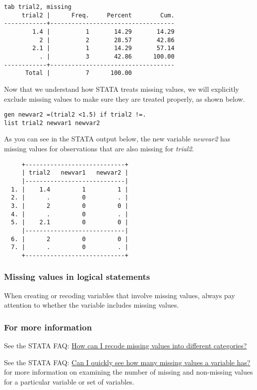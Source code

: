 \begin{lstlisting}
tab trial2, missing
     trial2 |      Freq.     Percent        Cum.
------------+-----------------------------------
        1.4 |          1       14.29       14.29
          2 |          2       28.57       42.86
        2.1 |          1       14.29       57.14
          . |          3       42.86      100.00
------------+-----------------------------------
      Total |          7      100.00
\end{lstlisting}

Now that we understand how STATA treats missing values, we will explicitly exclude missing values to make sure they are treated properly, as shown below.

\begin{lstlisting}
gen newvar2 =(trial2 <1.5) if trial2 !=.
list trial2 newvar1 newvar2
\end{lstlisting}

As you can see in the STATA output below, the new variable \textit{newvar2} has missing values for observations that are also missing for \textit{trial2}.

\begin{lstlisting}
     +----------------------------+
     | trial2   newvar1   newvar2 |
     |----------------------------|
  1. |    1.4         1         1 |
  2. |      .         0         . |
  3. |      2         0         0 |
  4. |      .         0         . |
  5. |    2.1         0         0 |
     |----------------------------|
  6. |      2         0         0 |
  7. |      .         0         . |
     +----------------------------+
\end{lstlisting}

\subsubsection{Missing values in logical statements}

When creating or recoding variables that involve missing values, always pay attention to whether the variable includes missing values.

\subsubsection{For more information}

\begin{compactitem}
\item See the STATA FAQ: \href{http://www.ats.ucla.edu/stat/stata/faq/missing_mvencode.htm}{How can I recode missing values into different categories?}
\item See the STATA FAQ: \href{http://www.ats.ucla.edu/stat/stata/faq/nmissing.htm}{Can I quickly see how many missing values a variable has?} for more information on examining the number of missing and non-missing values for a particular variable or set of variables.
\end{compactitem}

